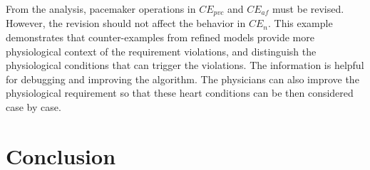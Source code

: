 From the analysis, pacemaker operations in $CE_{pvc}$ and $CE_{af}$ must be revised. However, the revision should not affect the behavior in $CE_{n}$. This example demonstrates that counter-examples from refined models provide more physiological context of the requirement violations, and distinguish the physiological conditions that can trigger the violations. The information is helpful for debugging and improving the algorithm. The physicians can also improve the physiological requirement so that these heart conditions can be then considered case by case.
\section{Conclusion}

